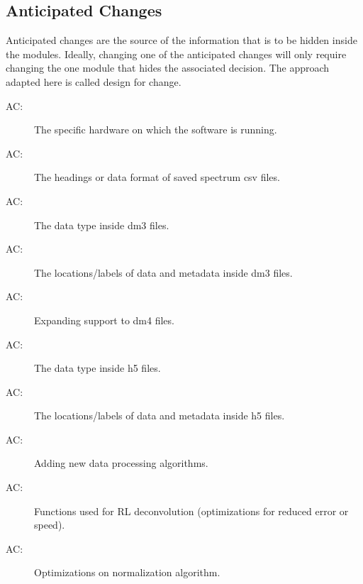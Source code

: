 \documentclass[12pt, titlepage]{article}
\newcounter{acnum}
\newcommand{\actheacnum}{AC\theacnum}
\begin{document}
\subsection{Anticipated Changes} \label{SecAchange}

Anticipated changes are the source of the information that is to be hidden
inside the modules. Ideally, changing one of the anticipated changes will only
require changing the one module that hides the associated decision. The approach
adapted here is called design for
change.

\begin{description}
	\item[ \actheacnum \label{acHardware}:] The specific
	  hardware on which the software is running.
	\item[ \actheacnum \label{acCSVheadings}:] The headings
or data format of saved spectrum csv files.
	\item[ \actheacnum \label{acDM3datatype}:] The data type
inside dm3 files.
	\item[ \actheacnum \label{acDM3labels}:] The
locations/labels of data and metadata inside dm3 files. 
	\item[ \actheacnum \label{acDM4support}:] Expanding
support to dm4 files.
	\item[ \actheacnum \label{acH5datatype}:] The data type
inside h5 files.
	\item[ \actheacnum \label{acH5labels}:] The
locations/labels of data and metadata inside h5 files.
	\item[ \actheacnum \label{acNewDataProcessing}:] Adding
new data processing algorithms.
	\item[ \actheacnum \label{acRLoptimize}:] Functions used
for RL deconvolution (optimizations for reduced error or speed).
	\item[ \actheacnum \label{acNorm}:] Optimizations on
normalization algorithm.  
\end{description}
\end{document}
